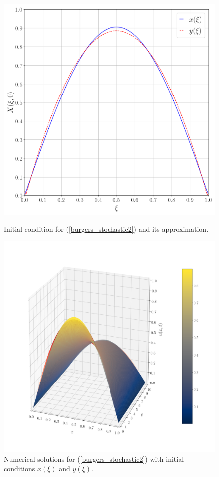 \newpage
	\begin{figure}[H]	
		\centering	
		\includegraphics[width=.55\textwidth]{burgers_equation/stochastic/numerical_experiments/figures/IC.png}
		\caption{Initial condition for (\ref{burgers_stochastic2}) and its approximation.}
		\label{IC_Cheb}	
		\includegraphics[width=.9\textwidth]{burgers_equation/stochastic/numerical_experiments/figures/Numerical_Solution_Stochastic.png}
		\caption{Numerical solutions for (\ref{burgers_stochastic2}) with initial conditions $x(\xi)$ and $y(\xi)$.}
		\label{Stochastic_Solutions}	
	\end{figure}
\newpage
